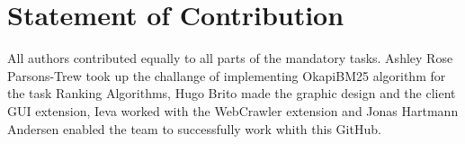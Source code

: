 \section{Statement of Contribution}
\label{sec:Statement of Contribution}
All authors contributed equally to all parts of the mandatory tasks. Ashley Rose Parsons-Trew took up the challange of implementing OkapiBM25 algorithm for the task Ranking Algorithms, Hugo Brito made the graphic design and the client GUI extension, Ieva worked with the WebCrawler extension and Jonas Hartmann Andersen enabled the team to successfully work whith this GitHub.